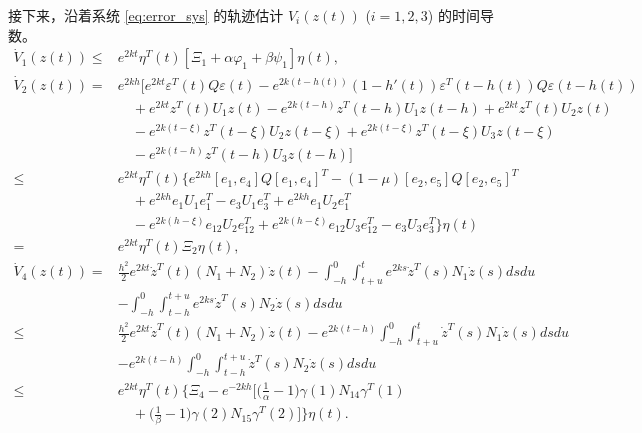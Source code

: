 \documentclass[a4paper, 12pt, oneside]{article}
\theoremstyle{cn_theorem}
\begin{document}
接下来，沿着系统 \eqref{eq:error_sys} 的轨迹估计 $V_i(z(t))$ ($i=1,2,3$) 的时间导数。
\begin{align*}
    \dot{V}_1(z(t)) \le & e^{2kt} \eta^T(t) [\Xi_1 + \alpha \varphi_1 + \beta \psi_1] \eta(t), \\
    \dot{V}_2(z(t)) =& e^{2kh} \Big[ e^{2kt} \varepsilon^T(t) Q \varepsilon(t) - e^{2k(t-h(t))}(1-h'(t)) \varepsilon^T(t-h(t)) Q \varepsilon(t-h(t)) \nonumber \\
                     & \quad + e^{2kt} z^T(t) U_1 z(t) - e^{2k(t-h)} z^T(t-h) U_1 z(t-h) + e^{2kt} z^T(t) U_2 z(t) \nonumber \\
                     & \quad - e^{2k(t-\xi)} z^T(t-\xi) U_2 z(t-\xi) + e^{2k(t-\xi)} z^T(t-\xi) U_3 z(t-\xi) \nonumber \\
                     & \quad - e^{2k(t-h)} z^T(t-h) U_3 z(t-h) \Big] \\
    \le & e^{2kt} \eta^T(t) \Big\{ e^{2kh}[e_1, e_4] Q [e_1, e_4]^T - (1-\mu)[e_2, e_5] Q [e_2, e_5]^T \nonumber \\
        & \quad + e^{2kh} e_1 U_1 e_1^T - e_3 U_1 e_3^T + e^{2kh} e_1 U_2 e_1^T \nonumber \\
        & \quad - e^{2k(h-\xi)} e_{12} U_2 e_{12}^T + e^{2k(h-\xi)} e_{12} U_3 e_{12}^T - e_3 U_3 e_3^T \Big\} \eta(t) \\
    =& e^{2kt} \eta^T(t) \Xi_2 \eta(t), \\
    \dot{V}_4(z(t)) =& \frac{h^2}{2} e^{2kt} \dot{z}^T(t)(N_1 + N_2) \dot{z}(t) - \int_{-h}^0 \int_{t+u}^t e^{2ks} \dot{z}^T(s) N_1 \dot{z}(s) ds du \nonumber \\
                     & - \int_{-h}^0 \int_{t-h}^{t+u} e^{2ks} \dot{z}^T(s) N_2 \dot{z}(s) ds du \\
    \le & \frac{h^2}{2} e^{2kt} \dot{z}^T(t)(N_1 + N_2) \dot{z}(t) - e^{2k(t-h)} \int_{-h}^0 \int_{t+u}^t \dot{z}^T(s) N_1 \dot{z}(s) ds du \nonumber \\
        & - e^{2k(t-h)} \int_{-h}^0 \int_{t-h}^{t+u} \dot{z}^T(s) N_2 \dot{z}(s) ds du \\
    \le & e^{2kt} \eta^T(t) \Big\{ \Xi_4 - e^{-2kh} \Big[ \Big(\frac{1}{\alpha}-1\Big) \gamma(1) N_{14} \gamma^T(1) \nonumber \\
        & \quad + \Big(\frac{1}{\beta}-1\Big) \gamma(2) N_{15} \gamma^T(2) \Big] \Big\} \eta(t).
\end{align*}
\end{document}
